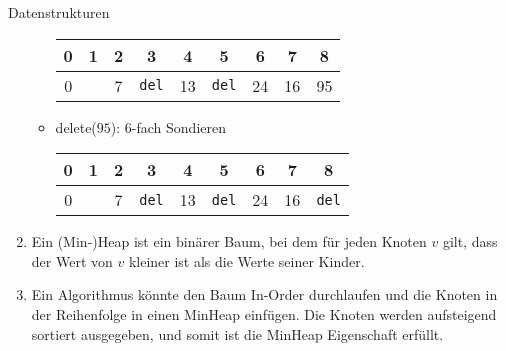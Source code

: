 \documentclass{article}
\begin{document}
\begin{exercise}{Datenstrukturen}
\begin{solution}
\begin{enumerate}
\begin{itemize}
\begin{tabular}{c|c|c|c|c|c|c|c|c}
                      0 & 1 & 2 & 3            & 4  & 5            & 6  & 7  & 8  \\
                      \hline
                      0 &   & 7 & \texttt{del} & 13 & \texttt{del} & 24 & 16 & 95 \\
                    \end{tabular}
              \item delete($95$): 6-fach Sondieren \begin{tabular}{c|c|c|c|c|c|c|c|c}
                      0 & 1 & 2 & 3            & 4  & 5            & 6  & 7  & 8            \\
                      \hline
                      0 &   & 7 & \texttt{del} & 13 & \texttt{del} & 24 & 16 & \texttt{del} \\
                    \end{tabular}
            \end{itemize}
      \item Ein (Min-)Heap ist ein binärer Baum, bei dem für jeden Knoten $v$ gilt, dass der Wert von $v$ kleiner ist als die Werte seiner Kinder.
      \item Ein Algorithmus könnte den Baum In-Order durchlaufen und die Knoten in der Reihenfolge in einen MinHeap einfügen. Die Knoten werden aufsteigend sortiert ausgegeben, und somit ist die MinHeap Eigenschaft erfüllt.
    \end{enumerate}
  \end{solution}
\end{exercise}
\end{document}
